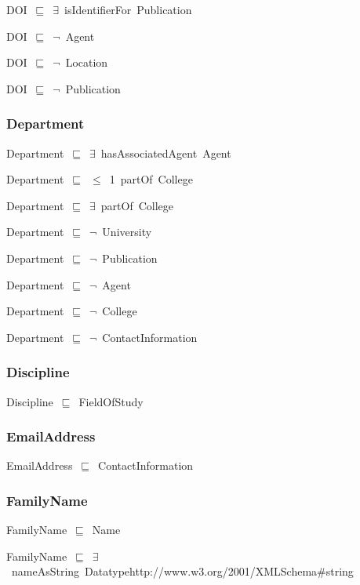 \documentclass{article}
\begin{document}
DOI~\ensuremath{\sqsubseteq}~\ensuremath{\exists}~isIdentifierFor~Publication~

DOI~\ensuremath{\sqsubseteq}~\ensuremath{\lnot}~Agent

DOI~\ensuremath{\sqsubseteq}~\ensuremath{\lnot}~Location

DOI~\ensuremath{\sqsubseteq}~\ensuremath{\lnot}~Publication

\subsubsection*{Department}

Department~\ensuremath{\sqsubseteq}~\ensuremath{\exists}~hasAssociatedAgent~Agent~

Department~\ensuremath{\sqsubseteq}~\ensuremath{\leq}~1~partOf~College~

Department~\ensuremath{\sqsubseteq}~\ensuremath{\exists}~partOf~College~

Department~\ensuremath{\sqsubseteq}~\ensuremath{\lnot}~University

Department~\ensuremath{\sqsubseteq}~\ensuremath{\lnot}~Publication

Department~\ensuremath{\sqsubseteq}~\ensuremath{\lnot}~Agent

Department~\ensuremath{\sqsubseteq}~\ensuremath{\lnot}~College

Department~\ensuremath{\sqsubseteq}~\ensuremath{\lnot}~ContactInformation

\subsubsection*{Discipline}

Discipline~\ensuremath{\sqsubseteq}~FieldOfStudy~

\subsubsection*{EmailAddress}

EmailAddress~\ensuremath{\sqsubseteq}~ContactInformation~

\subsubsection*{FamilyName}

FamilyName~\ensuremath{\sqsubseteq}~Name~

FamilyName~\ensuremath{\sqsubseteq}~\ensuremath{\exists}~nameAsString~Datatypehttp://www.w3.org/2001/XMLSchema#string~
\end{document}
